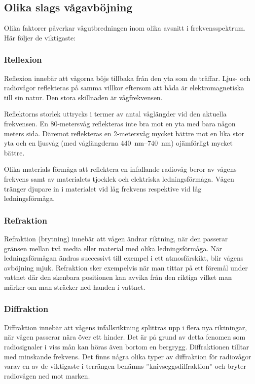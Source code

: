 \subsection{Olika slags vågavböjning}

Olika faktorer påverkar vågutbredningen inom olika avsnitt i
frekvensspektrum. Här följer de viktigaste:

\subsubsection{Reflexion}
\label{vågutbredning_reflektion}

Reflexion innebär att vågorna böjs tillbaka från den yta som de träffar.
Ljus- och radiovågor reflekteras på samma villkor eftersom att båda är
elektromagnetiska till sin natur.
Den stora skillnaden är vågfrekvensen.

Reflektorns storlek uttrycks i termer av antal våglängder vid den
aktuella frekvensen.
En 80-metersvåg reflekteras inte bra mot en yta med bara någon meters sida.
Däremot reflekteras en 2-metersvåg mycket bättre mot en lika stor yta och en
ljusvåg (med våglängderna \SIrange{440}{740}{\nano\metre}) ojämförligt mycket bättre.

Olika materials förmåga att reflektera en infallande radiovåg beror av
vågens frekvens samt av materialets tjocklek och elektriska ledningsförmåga.
Vågen tränger djupare in i materialet vid låg frekvens respektive vid låg
ledningsförmåga.

\subsubsection{Refraktion}

Refraktion (brytning) innebär att vågen ändrar riktning, när den passerar
gränsen mellan två media eller material med olika ledningsförmåga.
När ledningsförmågan ändras successivt till exempel i ett atmosfärskikt, blir
vågens avböjning mjuk.
Refraktion sker exempelvis när man tittar på ett föremål under vattnet där den
skenbara positionen kan avvika från den riktiga vilket man märker om man
sträcker ned handen i vattnet.

\subsubsection{Diffraktion}

Diffraktion innebär att vågens infallsriktning splittras upp i flera nya
riktningar, när vågen passerar nära över ett hinder.
Det är på grund av detta fenomen som radiosignaler i viss mån kan höras även
bortom en bergrygg.
Diffraktionen tilltar med minskande frekvens.
Det finns några olika typer av diffraktion för radiovågor varav en av de
viktigaste i terrängen benämns ''knivseggsdiffraktion'' och bryter radiovågen
ned mot marken.
